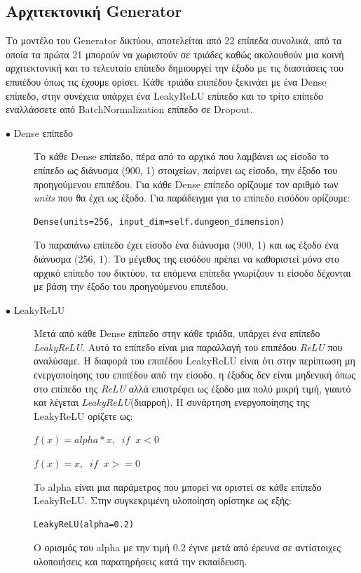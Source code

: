 \subsection{Αρχιτεκτονική Generator}
Το μοντέλο του Generator δικτύου, αποτελείται από 22 επίπεδα συνολικά, από τα οποία τα πρώτα 21 μπορούν να χωριστούν σε τριάδες καθώς ακολουθούν μια κοινή αρχιτεκτονική και το τελευταίο επίπεδο δημιουργεί την έξοδο με τις διαστάσεις του επιπέδου όπως τις έχουμε ορίσει. Κάθε τριάδα επιπέδου ξεκινάει με ένα Dense επίπεδο, στην συνέχεια υπάρχει ένα LeakyReLU επίπεδο \cite{leakyrelu} και το τρίτο επίπεδο εναλλάσσετε από BatchNormalization επίπεδο σε Dropout. 

\begin{description}
\item[$\bullet$ Dense επίπεδο] Το κάθε Dense επίπεδο, πέρα από το αρχικό που λαμβάνει ως είσοδο το επίπεδο ως διάνυσμα (900, 1) στοιχείων, παίρνει ως είσοδο, την έξοδο του προηγούμενου επιπέδου. Για κάθε Dense επίπεδο ορίζουμε τον αριθμό των \textit{units} που θα έχει ως έξοδο. Για παράδειγμα για το επίπεδο εισόδου ορίζουμε:
\begin{verbatim}
Dense(units=256, input_dim=self.dungeon_dimension)
\end{verbatim}
\par
Το παραπάνω επίπεδο έχει είσοδο ένα διάνυσμα (900, 1) και ως έξοδο ένα διάνυσμα (256, 1). Το μέγεθος της εισόδου πρέπει να καθοριστεί μόνο στο αρχικό επίπεδο του δικτύου, τα επόμενα επίπεδα γνωρίζουν τι είσοδο δέχονται με βάση την έξοδο του προηγούμενου επιπέδου.  \cite{dense}
\end{description}

\begin{description}
\item[$\bullet$ LeakyReLU] Μετά από κάθε Dense επίπεδο στην κάθε τριάδα, υπάρχει ένα επίπεδο \textit{LeakyReLU}. Αυτό το επίπεδο είναι μια παραλλαγή του επιπέδου \textit{ReLU} που αναλύσαμε. Η διαφορά  του επιπέδου LeakyReLU είναι ότι στην περίπτωση μη ενεργοποίησης του επιπέδου από την είσοδο, η έξοδος δεν είναι μηδενική όπως στο επίπεδο της \textit{ReLU} αλλά επιστρέφει ως έξοδο μια πολύ μικρή τιμή, γιαυτό και λέγεται \textit{LeakyReLU}(διαρροή). Η συνάρτηση ενεργοποίησης της LeakyReLU ορίζετε ως:
\par
$f(x) = alpha * x,  \;\; if \;\; x < 0$
\par
$f(x) = x,  \;\; if \;\; x >= 0$
\par
To alpha είναι μια παράμετρος που μπορεί να οριστεί σε κάθε επίπεδο LeakyReLU. Στην συγκεκριμένη υλοποίηση ορίστηκε ως εξής:
\begin{verbatim}
LeakyReLU(alpha=0.2)
\end{verbatim}
\par
O ορισμός του alpha με την τιμή 0.2 έγινε μετά από έρευνα σε αντίστοιχες υλοποιήσεις και παρατηρήσεις κατά την εκπαίδευση. \cite{firstgan} \cite{firstgan2} \cite{firstgan3} 
\end{description}

